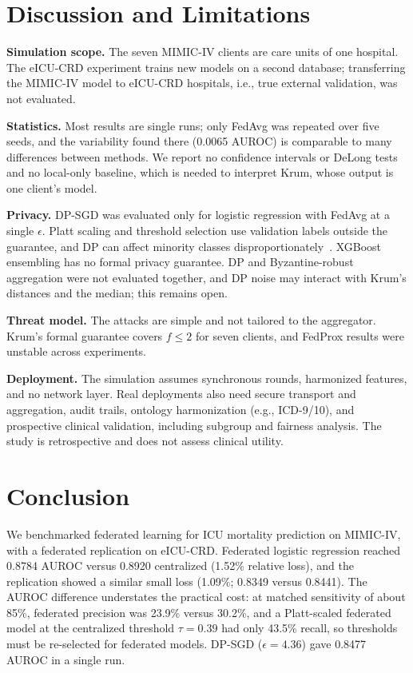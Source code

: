 \documentclass[journal]{IEEEtran}
\begin{document}
\FloatBarrier
\section{Discussion and Limitations}
\label{sec:limits}

\textbf{Simulation scope.} The seven MIMIC-IV clients are care units of one hospital. The eICU-CRD experiment trains new models on a second database; transferring the MIMIC-IV model to eICU-CRD hospitals, i.e., true external validation, was not evaluated.

\textbf{Statistics.} Most results are single runs; only FedAvg was repeated over five seeds, and the variability found there (0.0065 AUROC) is comparable to many differences between methods. We report no confidence intervals or DeLong tests and no local-only baseline, which is needed to interpret Krum, whose output is one client's model.

\textbf{Privacy.} DP-SGD was evaluated only for logistic regression with FedAvg at a single $\epsilon$. Platt scaling and threshold selection use validation labels outside the guarantee, and DP can affect minority classes disproportionately~\cite{bagdasaryan2019differential}. XGBoost ensembling has no formal privacy guarantee. DP and Byzantine-robust aggregation were not evaluated together, and DP noise may interact with Krum's distances and the median; this remains open.

\textbf{Threat model.} The attacks are simple and not tailored to the aggregator. Krum's formal guarantee covers $f\le2$ for seven clients, and FedProx results were unstable across experiments.

\textbf{Deployment.} The simulation assumes synchronous rounds, harmonized features, and no network layer. Real deployments also need secure transport and aggregation, audit trails, ontology harmonization (e.g., ICD-9/10), and prospective clinical validation, including subgroup and fairness analysis. The study is retrospective and does not assess clinical utility.

\section{Conclusion}
\label{sec:conclusion}
We benchmarked federated learning for ICU mortality prediction on MIMIC-IV, with a federated replication on eICU-CRD. Federated logistic regression reached 0.8784 AUROC versus 0.8920 centralized (1.52\% relative loss), and the replication showed a similar small loss (1.09\%; 0.8349 versus 0.8441). The AUROC difference understates the practical cost: at matched sensitivity of about 85\%, federated precision was 23.9\% versus 30.2\%, and a Platt-scaled federated model at the centralized threshold $\tau=0.39$ had only 43.5\% recall, so thresholds must be re-selected for federated models. DP-SGD ($\epsilon=4.36$) gave 0.8477 AUROC in a single run.
\end{document}
